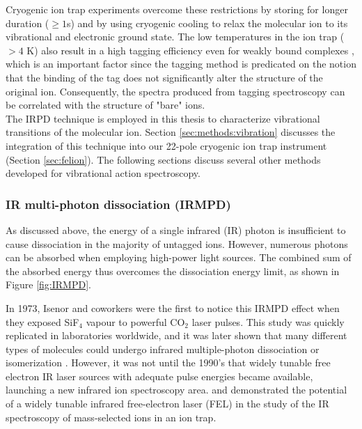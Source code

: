 Cryogenic ion trap experiments overcome these restrictions \cite{asmis_mass-selected_2002, kohguchi_high-resolution_2018, jusko_felion_2019, topfer_spectroscopic_2020, dahlmann_predissociation_2022} by storing for longer duration ($\geq 1$s) and by using cryogenic cooling to relax the molecular ion to its vibrational and electronic ground state. The low temperatures in the ion trap ($> 4$ K) also result in a high tagging efficiency even for weakly bound complexes \cite{roithova_helium_2016, gerlich_infrared_2018}, which is an important factor since the tagging method is predicated on the notion that the binding of the tag does not significantly alter the structure of the original ion. Consequently, the spectra produced from tagging spectroscopy can be correlated with the structure of "bare" ions.\\

The IRPD technique is employed in this thesis to characterize vibrational transitions of the molecular ion. Section \ref{sec:methods:vibration} discusses the integration of this technique into our 22-pole cryogenic ion trap instrument (Section \ref{sec:felion}). The following sections discuss several other methods developed for vibrational action spectroscopy.

\subsubsection{IR multi-photon dissociation (IRMPD)}
\label{subsec:action:methods:vibrational:IRMPD}

As discussed above, the energy of a single infrared (IR) photon is insufficient to cause dissociation in the majority of untagged ions. However, numerous photons can be absorbed when employing high-power light sources. The combined sum of the absorbed energy thus overcomes the dissociation energy limit, as shown in Figure \ref{fig:IRMPD}.

In 1973, Isenor and coworkers \cite{isenor_co2_1973} were the first to notice this IRMPD effect when they exposed SiF$_4$ vapour to powerful CO$_2$ laser pulses. This study was quickly replicated in laboratories worldwide, and it was later shown that many different types of molecules could undergo infrared multiple-photon dissociation or isomerization \cite{wight_infrared_1981, gaumann_infrared_1990, peiris_infrared_1993}. However, it was not until the 1990's that widely tunable free electron IR laser sources with adequate pulse energies became available, launching a new infrared ion spectroscopy area. \citet{oomens_gas-phase_2000} and \citet{lemaire_gas_2002} demonstrated the potential of a widely tunable infrared free-electron laser (FEL) in the study of the IR spectroscopy of mass-selected ions in an ion trap. 

